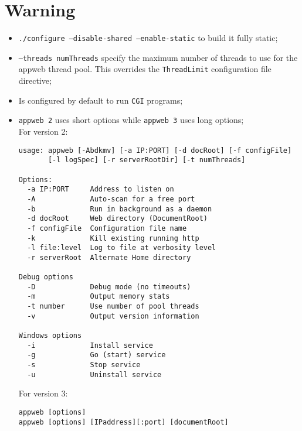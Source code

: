 \documentclass[a4paper]{report}
\begin{document}
\section{Warning}
\begin{itemize}
    \item {\tt ./configure --disable-shared --enable-static} to build it fully static;
    \item {\tt --threads numThreads} specify the maximum number of threads to use for 
          the appweb thread pool. This overrides the {\tt ThreadLimit} configuration file
          directive;
    \item Is configured by default to run {\tt CGI} programs;
    \item {\tt appweb 2} uses short options while {\tt appweb 3} uses long options;\\
          For version 2:
\begin{lstlisting}
usage: appweb [-Abdkmv] [-a IP:PORT] [-d docRoot] [-f configFile]
       [-l logSpec] [-r serverRootDir] [-t numThreads]

Options:
  -a IP:PORT     Address to listen on
  -A             Auto-scan for a free port
  -b             Run in background as a daemon
  -d docRoot     Web directory (DocumentRoot)
  -f configFile  Configuration file name
  -k             Kill existing running http
  -l file:level  Log to file at verbosity level
  -r serverRoot  Alternate Home directory

Debug options
  -D             Debug mode (no timeouts)
  -m             Output memory stats
  -t number      Use number of pool threads
  -v             Output version information

Windows options
  -i             Install service
  -g             Go (start) service
  -s             Stop service
  -u             Uninstall service
\end{lstlisting}
          For version 3:
\begin{lstlisting}
appweb [options]
appweb [options] [IPaddress][:port] [documentRoot] 


\end{lstlisting}
\end{itemize}
\end{document}
